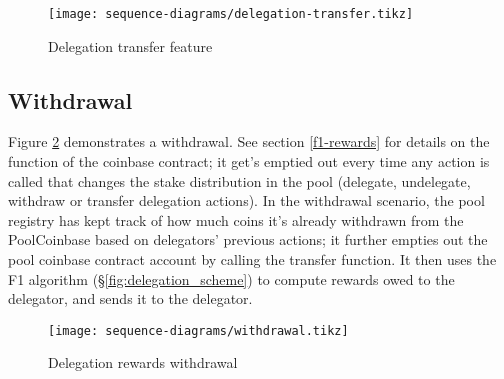 \begin{figure}[ht]
\centering
\texttt{[image: sequence-diagrams/delegation-transfer.tikz]}
\caption{Delegation transfer feature}
\label{fig:delegation_transfer}
\end{figure}
\clearpage

\subsection{Withdrawal}

Figure \ref{fig:withdrawal} demonstrates a withdrawal. See section \ref{f1-rewards} for details on the function of the coinbase contract; it get's emptied out every time any action is called that changes the stake distribution in the pool (delegate, undelegate, withdraw or transfer delegation actions). In the withdrawal scenario, the pool registry has kept track of how much coins it's already withdrawn from the PoolCoinbase based on delegators' previous actions; it further empties out the pool coinbase contract account by calling the transfer function. It then uses the F1 algorithm (\S\ref{fig:delegation_scheme}) to compute rewards owed to the delegator, and sends it to the delegator.  

\begin{figure}[ht]
\centering
\texttt{[image: sequence-diagrams/withdrawal.tikz]}
\caption{Delegation rewards withdrawal}
\label{fig:withdrawal}
\end{figure}
\clearpage